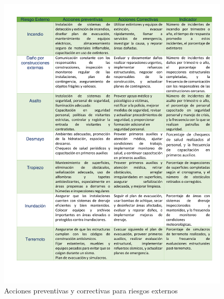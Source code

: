     \begin{figure}[H]
        \centering
        \includegraphics[scale=0.3]{32/img/accionesRiesgosExternos.pdf}
        \caption{Acciones preventivas y correctivas para riesgos externos}
        \label{fig:enter-label}
    \end{figure}
    
